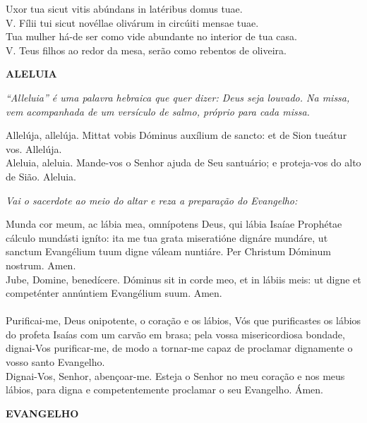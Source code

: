 \begin{multicols}{2}
	\noindent
	Uxor tua sicut vitis abúndans in latéribus domus tuae. 
	\\V. Fílii tui sicut novéllae olivárum in circúiti mensae tuae.
	\\Tua mulher há-de ser como vide abundante no interior de tua casa. 
	\\V. Teus filhos ao redor da mesa, serão como rebentos de oliveira.
\end{multicols}
\begin{center}
	\textbf{ALELUIA}
\end{center}
\textit{“Alleluia” é uma palavra hebraica que quer dizer: Deus seja louvado. Na missa, vem acompanhada de um versículo de salmo, próprio para cada missa.}
\begin{multicols}{2}
	\noindent
	Allelúja, allelúja. 
	Mittat vobis Dóminus auxílium de sancto: et de Sion tueátur vos. 
	Allelúja.
	\\Aleluia, aleluia. 
	Mande-vos o Senhor ajuda de Seu santuário; e proteja-vos do alto de Sião. Aleluia.
\end{multicols}
\textit{Vai o sacerdote ao meio do altar e reza a preparação do Evangelho:}
\begin{multicols}{2}
	\noindent
	Munda cor meum, ac lábia mea, omnípotens Deus, qui lábia Isaíae Prophétae cálculo mundásti igníto: ita me tua grata miseratióne dignáre mundáre, ut sanctum Evangélium tuum digne váleam nuntiáre. Per Christum Dóminum nostrum. Amen.
	\\Jube, Domine, benedícere. Dóminus sit in corde meo, et in lábiis meis: ut digne et competénter annúntiem Evangélium suum. Amen. 
	\\
	\\Purificai-me, Deus onipotente, o coração e os lábios, Vós que purificastes os lábios do profeta Isaías com um carvão em brasa; pela vossa misericordiosa bondade, dignai-Vos purificar-me, de modo a tornar-me capaz de proclamar dignamente o vosso santo Evangelho.
	\\Dignai-Vos, Senhor, abençoar-me. Esteja o Senhor no meu coração e nos meus lábios, para digna e competentemente proclamar o seu Evangelho. Ámen.
\end{multicols}
\newpage
\begin{center}
	\textbf{EVANGELHO}
\end{center}
